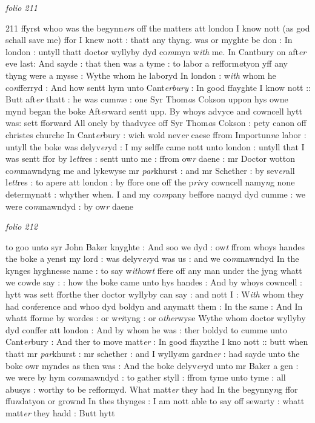 \documentclass[12pt, a4paper]{book}
\begin{document}
\textit{folio 211}



{\color{Mahogany}211} ffyrst whoo was the begynn\textit{er}s off the matters att london I know nott (as god schall save me) ffor I knew nott : thatt any thyng. was or myghte be don : In london : untyll thatt doctor wyllyby dyd co\textit{m}myn w\textit{ith} me. In Cantbury on aft\textit{er} eve last: And sayde : that then was a tyme : to labor a refform\textit{a}tyon yff any thyng were a mysse : Wythe whom he laboryd In london : w\textit{ith} whom he co\textit{n}fferryd : And how sentt hym unto Cant\textit{erbury} : In good ffayghte I know nott :: Butt aft\textit{er} thatt : he was cum\textit{m}e : one Syr Thom\textit{a}s Cokson uppon hys owne mynd began the boke Aft\textit{er}ward sentt upp. By whoys advyce and cowncell hytt was: sett fforward All onely by thadvyce off Syr Thom\textit{a}s Cokson : pety canon off christes churche In Cant\textit{er}bury : wich wold nev\textit{er} caese ffrom Importun\textit{n}e labor : untyll the boke was delyv\textit{er}yd : I my selffe came nott unto london : untyll that I was sentt ffor by l\textit{ett}res : sentt unto me : ffrom ow\textit{r} daene : mr Doctor wotton co\textit{m}mawndyng me
			 and lykewyse mr \textit{par}khurst : and mr Schether : by sev\textit{er}all  l\textit{ett}res : to apere att london : by ffore one off the p\textit{ri}vy cowncell namy\textit{n}g none determynatt : whyther when. I and my co\textit{m}pany beffore namyd dyd cumme : we were co\textit{m}mawndyd : by ow\textit{r} daene

\dotfill
					

\textit{folio 212}


to goo unto syr John Baker knyghte : And soo we dyd : ow\textit{t} ffrom whoys handes the boke a yenst my lord : was delyv\textit{er}yd was us : and  we co\textit{m}mawndyd In the kynges hyghnesse name : to say w\textit{ith}ow\textit{t} ffere off any man under the jyng whatt we cowde say : : how the boke came unto hys handes : And by whoys cowncell : hytt was  sett fforthe ther doctor wyllyby can say : and nott I : W\textit{ith} whom they had co\textit{n}ference and whoo dyd boldyn and anymatt them : In the same : And In whatt fforme by wordes : or w\textit{ri}tyng : or o\textit{ther}wyse Wythe whom doctor wyllyby dyd conffer att london : And by whom he  was : ther boldyd to cumme unto Cant\textit{er}bury : And ther to move matt\textit{er} : In good ffayzthe I kno nott :: butt when thatt mr \textit{par}khurst : mr schether : and I wylly\textit{a}m gardn\textit{er} : had sayde unto the boke owr myndes as then was : And the boke delyv\textit{er}yd unto mr Baker a gen : we were by hym co\textit{m}mawndyd : to gather styll : ffrom tyme unto tyme : all abusys : worthy to be refformyd. What matt\textit{er} they had In the begynny\textit{n}g ffor ffu\textit{n}datyon or grownd In thes thynges : I am nott able to say off sewarty : whatt matt\textit{er} they hadd : Butt hytt
\end{document}
